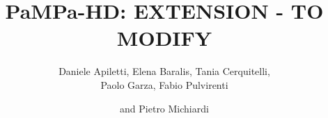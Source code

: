 \documentclass[preprint,review,12pt]{elsarticle}
\begin{document}
\begin{frontmatter}



\title{PaMPa-HD: EXTENSION - TO MODIFY}


\author[label1]{Daniele Apiletti,
Elena Baralis,
Tania Cerquitelli, \\
Paolo Garza, Fabio Pulvirenti}
\author[label2]{and Pietro Michiardi}

\address[label1]{Dipartimento di Automatica e Informatica\\
Politecnico di Torino\\
Torino, Italy\\ Email: name.surname@polito.it}
\address[label2]{Data Science Department\\ Eurecom\\
Sophia Antipolis, France\\ Email: pietro.michiardi@eurecom.fr}
\begin{abstract}

\end{abstract}

\begin{keyword}



\end{keyword}

\end{frontmatter}
\end{document}
